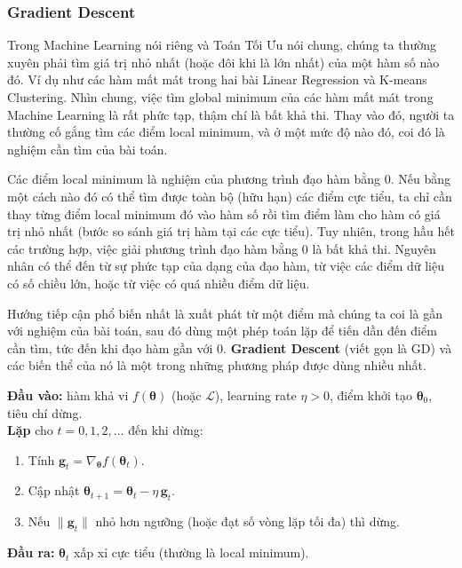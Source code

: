 \subsubsection{Gradient Descent}

\begin{dongco}[title={Tại sao cần tối ưu trong Machine Learning?}]
Trong Machine Learning nói riêng và Toán Tối Ưu nói chung, chúng ta thường xuyên phải tìm giá trị nhỏ nhất (hoặc đôi khi là lớn nhất) của một hàm số nào đó. Ví dụ như các hàm mất mát trong hai bài Linear Regression và K-means Clustering. Nhìn chung, việc tìm global minimum của các hàm mất mát trong Machine Learning là rất phức tạp, thậm chí là bất khả thi. Thay vào đó, người ta thường cố gắng tìm các điểm local minimum, và ở một mức độ nào đó, coi đó là nghiệm cần tìm của bài toán.
\end{dongco}

\begin{phuongphap}[title={Từ phương trình đạo hàm bằng 0 đến lặp}]
Các điểm local minimum là nghiệm của phương trình đạo hàm bằng $0$. Nếu bằng một cách nào đó có thể tìm được toàn bộ (hữu hạn) các điểm cực tiểu, ta chỉ cần thay từng điểm local minimum đó vào hàm số rồi tìm điểm làm cho hàm có giá trị nhỏ nhất (bước so sánh giá trị hàm tại các cực tiểu). Tuy nhiên, trong hầu hết các trường hợp, việc giải phương trình đạo hàm bằng $0$ là bất khả thi. Nguyên nhân có thể đến từ sự phức tạp của dạng của đạo hàm, từ việc các điểm dữ liệu có số chiều lớn, hoặc từ việc có quá nhiều điểm dữ liệu.

Hướng tiếp cận phổ biến nhất là xuất phát từ một điểm mà chúng ta coi là gần với nghiệm của bài toán, sau đó dùng một phép toán lặp để tiến dần đến điểm cần tìm, tức đến khi đạo hàm gần với $0$. \textbf{Gradient Descent} (viết gọn là GD) và các biến thể của nó là một trong những phương pháp được dùng nhiều nhất.
\end{phuongphap}

\begin{phuongphap}[title={Thuật toán Gradient Descent (khung chung)}]
\textbf{Đầu vào:} hàm khả vi $f(\boldsymbol{\theta})$ (hoặc $\mathcal{L}$), learning rate $\eta > 0$, điểm khởi tạo $\boldsymbol{\theta}_0$, tiêu chí dừng.\\
\textbf{Lặp} cho $t = 0, 1, 2, \ldots$ đến khi dừng:
\begin{enumerate}
  \item Tính $\mathbf{g}_t = \nabla_{\boldsymbol{\theta}} f(\boldsymbol{\theta}_t)$.
  \item Cập nhật $\boldsymbol{\theta}_{t+1} = \boldsymbol{\theta}_t - \eta\, \mathbf{g}_t$.
  \item Nếu $\|\mathbf{g}_t\|$ nhỏ hơn ngưỡng (hoặc đạt số vòng lặp tối đa) thì dừng.
\end{enumerate}
\textbf{Đầu ra:} $\boldsymbol{\theta}_t$ xấp xỉ cực tiểu (thường là local minimum).
\end{phuongphap}

